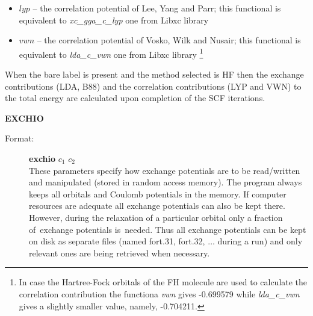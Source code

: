 \documentclass[12pt,a4paper]{article}
\begin{document}
\begin{description}
\begin{description}
\begin{itemize}
\begin{itemize}



\item $lyp$ -- the correlation potential of Lee, Yang and Parr; this functional is equivalent to
\textsl{xc\_gga\_c\_lyp} one from Libxc library

\item $vwn$ -- the correlation potential of Vosko, Wilk and Nusair;
  this functional is equivalent to \textsl{lda\_c\_vwn} one from Libxc library%
    \footnote{In case the Hartree-Fock orbitals of the FH molecule are used to calculate
      the correlation contribution the functiona \textsl{vwn} gives -0.699579 while
      \textsl{lda\_c\_vwn} gives a slightly smaller value, namely, -0.704211.}

\end{itemize}
\end{itemize}
\end{description}
When the bare label is present and the method selected is HF then the exchange
contributions (LDA, B88) and the correlation contributions (LYP and VWN) to the total
energy are calculated upon completion of the SCF iterations.

\item \textbf{EXCHIO}
\begin{description}
\item[Format:] \textbf{exchio} $c_1$ $c_2$\\ These parameters specify how exchange
  potentials are to be read/written and manipulated (stored in random access memory). The
  program always keeps all orbitals and Coulomb potentials in the memory. If computer
  resources are adequate all exchange potentials can also be kept there. However, during
  the relaxation of a particular orbital only a fraction of~exchange potentials
  is~needed. Thus all exchange potentials can be kept on disk as separate files (named
  fort.31, fort.32, $\ldots$ during a run) and only relevant ones are being retrieved when
  necessary.


\end{description}
\end{description}
\end{document}
